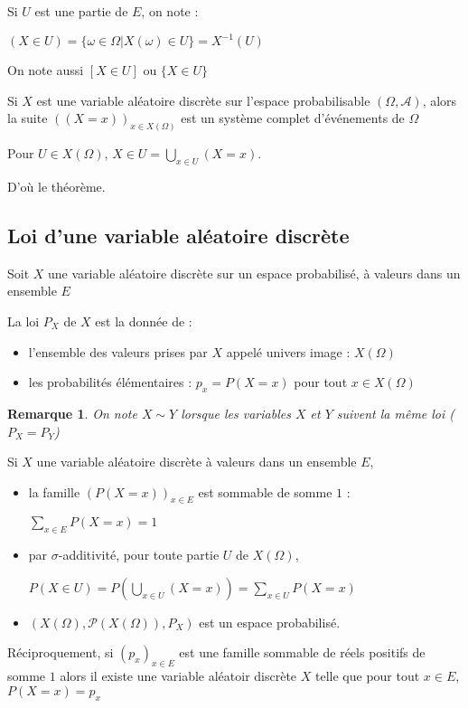 \documentclass[a4paper,12pt]{book}
\newcommand{\Def}[2]{\begin{tcolorbox}[sharp corners, colback=white,colframe=blue!90!black!75, title=Définition : #1]#2\end{tcolorbox}}
\newcommand{\Thr}[2]{\begin{tcolorbox}[sharp corners, colback=white,colframe=red!90!black!75, title=Théorème : #1]#2\end{tcolorbox}}
\newcommand{\Pre}[1]{\begin{tcolorbox}[sharp corners, colback=white,colframe=green!60!green!30!black!75, title=Preuve]#1\end{tcolorbox}}
\newtheorem{Rem}{Remarque}[section]
\begin{document}
Si $U$ est une partie de $E$, on note :
\par\begin{center}$(X\in U)=\{\omega\in\Omega\vert X(\omega)\in U\}=X^{-1}(U)$\end{center}
\par On note aussi $[X\in U]$ ou $\{X\in U\}$
\Thr{}{Si $X$ est une variable aléatoire discrète sur l'espace probabilisable $(\Omega, \mathcal{A})$, alors la suite $((X=x))_{x\in X(\Omega)}$ est un système complet d'événements de $\Omega$}
\Pre{Pour $U\in X(\Omega)$, $X\in U = \bigcup_{x\in U}(X=x)$. \par D'où le théorème.}

\subsection{Loi d'une variable aléatoire discrète}
\Def{}{Soit $X$ une variable aléatoire discrète sur un espace probabilisé, à valeurs dans un ensemble $E$
\par La loi $P_X$ de $X$ est la donnée de :\begin{itemize}
\item l'ensemble des valeurs prises par $X$ appelé univers image : $X(\Omega)$
\item les probabilités élémentaires : $p_x = P(X=x)$ pour tout $x\in X(\Omega)$
\end{itemize}}
\begin{Rem}
On note $X\sim Y$ lorsque les variables $X$ et $Y$ suivent la même loi ($P_X=P_Y$)
\end{Rem}
\Thr{}{Si $X$ une variable aléatoire discrète à valeurs dans un ensemble $E$, \begin{itemize}
\item la famille $(P(X=x))_{x\in E}$ est sommable de somme $1$ : \par\begin{center}$\sum\limits_{x\in E}P(X=x)=1$\end{center}
\item par $\sigma$-additivité, pour toute partie $U$ de $X(\Omega)$, \par\begin{center}$P(X\in U)=P\left(\bigcup_{x\in U}(X=x)\right)=\sum\limits_{x\in U}P(X=x)$ \end{center}
\item $(X(\Omega), \mathcal{P}(X(\Omega)), P_X)$ est un espace probabilisé.
\end{itemize}
Réciproquement, si $(p_x)_{x\in E}$ est une famille sommable de réels positifs de somme $1$ alors il existe une variable aléatoir discrète $X$ telle que pour tout $x\in E$, $P(X=x)=p_x$}
\end{document}
